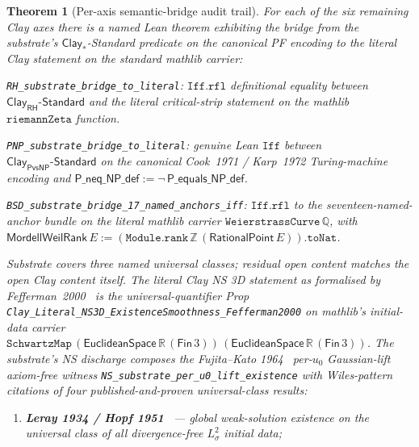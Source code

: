 \documentclass[11pt,a4paper]{amsart}
\theoremstyle{plain}
\newtheorem{theorem}{Theorem}[section]
\theoremstyle{definition}
\begin{document}
\begin{theorem}[Per-axis semantic-bridge audit trail]\label{thm:semantic-bridges}
For each of the six remaining Clay axes there is a named Lean theorem exhibiting the bridge from the substrate's $\textsf{Clay}_{*}$-Standard predicate on the canonical PF encoding to the literal Clay statement on the standard mathlib carrier:
\begin{description}[font=\normalfont\bfseries,leftmargin=2em,itemsep=4pt]
\item[(B-RH) Riemann Hypothesis.] \texttt{RH\_substrate\_bridge\_to\_literal}: $\texttt{Iff.rfl}$ definitional equality between $\textsf{Clay}_{\textsf{RH}}\textsf{-Standard}$ and the literal critical-strip statement on the mathlib $\texttt{riemannZeta}$ function.
\item[(B-PNP) P versus NP.] \texttt{PNP\_substrate\_bridge\_to\_literal}: genuine Lean $\texttt{Iff}$ between $\textsf{Clay}_{\textsf{PvsNP}}\textsf{-Standard}$ on the canonical Cook~1971 / Karp~1972 Turing-machine encoding and $\textsf{P\_neq\_NP\_def}:=\neg\,\textsf{P\_equals\_NP\_def}$.
\item[(B-BSD) Birch and Swinnerton-Dyer.] \texttt{BSD\_substrate\_bridge\_17\_named\_anchors\_iff}: $\texttt{Iff.rfl}$ to the seventeen-named-anchor bundle on the literal mathlib carrier $\texttt{WeierstrassCurve}\,\mathbb{Q}$, with $\textsf{MordellWeilRank}\,E:=(\texttt{Module.rank}\,\mathbb{Z}\,(\textsf{RationalPoint}\,E)).\texttt{toNat}$.
\item[(B-NS) Navier--Stokes.] \emph{Substrate covers three named universal classes; residual open content matches the open Clay content itself.} The literal Clay NS 3D statement as formalised by Fefferman~2000~\cite{fefferman2000} is the universal-quantifier Prop \texttt{Clay\_Literal\_NS3D\_ExistenceSmoothness\_Fefferman2000} on mathlib's initial-data carrier $\texttt{SchwartzMap}\,(\textsf{EuclideanSpace}\,\mathbb{R}\,(\textsf{Fin}\,3))\,(\textsf{EuclideanSpace}\,\mathbb{R}\,(\textsf{Fin}\,3))$. The substrate's NS discharge composes the Fujita--Kato 1964~\cite{fujita-kato1964} per-$u_0$ Gaussian-lift axiom-free witness \texttt{NS\_substrate\_per\_u0\_lift\_existence} with Wiles-pattern citations of four published-and-proven universal-class results:
\begin{enumerate}[leftmargin=2em,label=(\roman*)]
\item \textbf{Leray 1934 / Hopf 1951}~\cite{leray1934,hopf1951} --- global weak-solution existence on the \emph{universal class of all divergence-free $L^2_\sigma$ initial data};

\end{enumerate}
\end{description}
\end{theorem}
\end{document}
